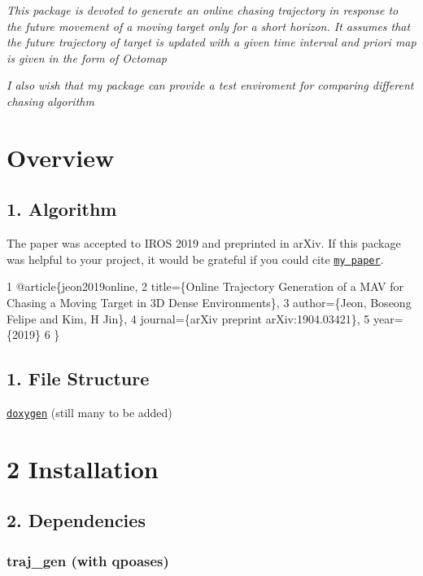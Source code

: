  



{\itshape This package is devoted to generate an online chasing trajectory in response to the future movement of a moving target only for a short horizon. It assumes that the future trajectory of target is updated with a given time interval and priori map is given in the form of Octomap}

{\itshape I also wish that my package can provide a test enviroment for comparing different chasing algorithm}

\section*{Overview}

\subsection*{1. Algorithm}



The paper was accepted to I\+R\+OS 2019 and preprinted in ar\+Xiv. If this package was helpful to your project, it would be grateful if you could cite \href{https://arxiv.org/pdf/1904.03421.pdf}{\tt my paper}.


\begin{DoxyCode}
1 @article\{jeon2019online,
2   title=\{Online Trajectory Generation of a MAV for Chasing a Moving Target in 3D Dense Environments\},
3   author=\{Jeon, Boseong Felipe and Kim, H Jin\},
4   journal=\{arXiv preprint arXiv:1904.03421\},
5   year=\{2019\}
6 \}
\end{DoxyCode}


\subsection*{1. File Structure}

\href{https://icsl-jeon.github.io/traj_gen_vis}{\tt doxygen} (still many to be added)

\section*{2 Installation}

\subsection*{2. Dependencies}

\subsubsection*{traj\+\_\+gen (with qpoases)}

